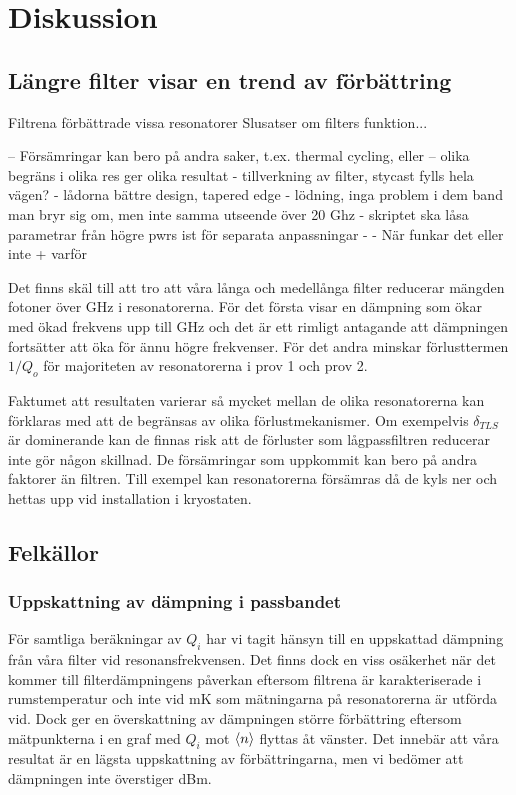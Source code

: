 \documentclass[main.tex]{subfiles}
\begin{document}
\chapter{Diskussion}
\label{ch:discussion} 

\section{Längre filter visar en trend av förbättring}
Filtrena förbättrade vissa resonatorer
Slusatser om filters funktion...


-- Försämringar kan bero på andra saker, t.ex. thermal cycling, eller 
-- olika begräns i olika res ger olika resultat 
- tillverkning av filter, stycast fylls hela vägen?
- lådorna bättre design, tapered edge
- lödning, inga problem i dem band man bryr sig om, men inte samma utseende över 20 Ghz
- skriptet ska låsa parametrar från högre pwrs ist för separata anpassningar 
- 
- När funkar det eller inte + varför

Det finns skäl till att tro att våra långa och medellånga filter reducerar mängden fotoner över \unit[88]{GHz} i resonatorerna. För det första visar  en dämpning som ökar med ökad frekvens upp till \unit[50]{GHz} och det är ett rimligt antagande att dämpningen fortsätter att öka för ännu högre frekvenser. För det andra minskar förlusttermen $1/Q_o$ för majoriteten av resonatorerna i prov 1 och prov 2.

Faktumet att resultaten varierar så mycket mellan de olika resonatorerna kan förklaras med att de begränsas av olika förlustmekanismer. Om exempelvis $\delta_{TLS}$ är dominerande kan de finnas risk att de förluster som lågpassfiltren reducerar inte gör någon skillnad.
De försämringar som uppkommit kan bero på andra faktorer än filtren. Till exempel kan resonatorerna försämras då de kyls ner och hettas upp vid installation i kryostaten.

\section{Felkällor}

\subsection{Uppskattning av dämpning i passbandet}
För samtliga beräkningar av $Q_i$ har vi tagit hänsyn till en uppskattad dämpning från våra filter vid resonansfrekvensen. Det finns dock en viss osäkerhet när det kommer till filterdämpningens påverkan eftersom filtrena är karakteriserade i rumstemperatur och inte vid \unit[10]{mK} som mätningarna på resonatorerna är utförda vid. Dock ger en överskattning av dämpningen större förbättring eftersom mätpunkterna i en graf med $Q_i$ mot $\expval{n}$ flyttas åt vänster. Det innebär att våra resultat är en lägsta uppskattning av förbättringarna, men vi bedömer att dämpningen inte överstiger \unit[-2]{dBm}.
\end{document}
